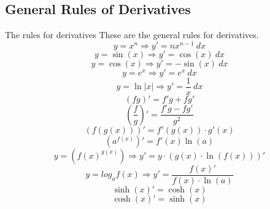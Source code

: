 \documentclass[letterpaper,10pt,twoside,twocolumn,openany]{book}
\begin{document}
\subsection{General Rules of Derivatives}
\begin{paperbox}{The rules for derivatives}
    These are the general rules for derivatives.
    \begin{equation}
        y = x^n \Rightarrow y' = nx^{n-1}\ dx
    \end{equation}
    \begin{equation}
        y = \sin(x) \Rightarrow y' = \cos(x)\ dx
    \end{equation}
    \begin{equation}
        y = \cos(x) \Rightarrow y' = -\sin(x)\ dx
    \end{equation}
    \begin{equation}
        y = e^x \Rightarrow y' = e^x\ dx
    \end{equation}
    \begin{equation}
        y = \ln|x| \Rightarrow y' = \frac{1}{x}\ dx
    \end{equation}
    \begin{equation}
        (fg)' = f'g + fg'
    \end{equation}
    \begin{equation}
        \left( \frac{f}{g} \right)' = \frac{f'g - fg'}{g^2}
    \end{equation}
    \begin{equation}
        (f(g(x)))' = f'(g(x)) \cdot g'(x)
    \end{equation}
    \begin{equation}
        (a^{f(x)})' = f'(x) \ln(a) 
    \end{equation}
    \begin{equation}
        y = (f(x)^{g(x)}) \Rightarrow y' = y\cdot (g(x)\cdot \ln(f(x)))'
    \end{equation}
    \begin{equation}
        y = log_a f(x) \Rightarrow y' = \frac{f(x)'}{f(x)\cdot\ln(a)}
    \end{equation}
    \begin{equation}
        \sinh(x)' = \cosh(x)
    \end{equation}
    \begin{equation}
        \cosh(x)' = \sinh(x)
    \end{equation}
\end{paperbox}
\end{document}
